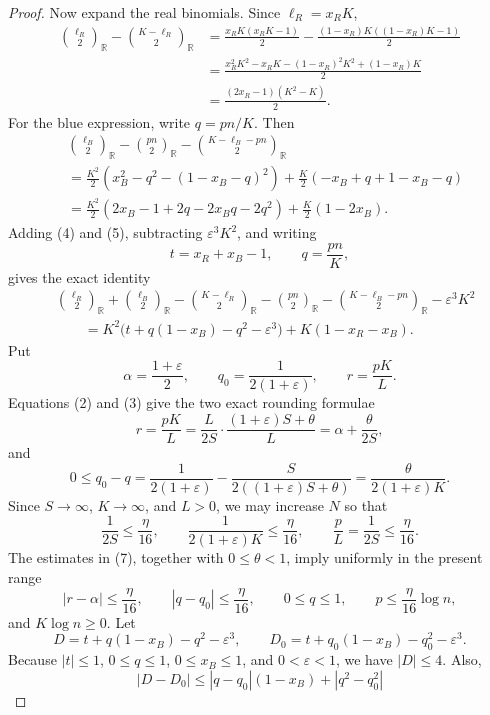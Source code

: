 \begin{proof}
Now expand the real binomials.  Since \(\ell_R=x_RK\),
\[
\begin{aligned}
\binom{\ell_R}{2}_{\mathbb R}
-\binom{K-\ell_R}{2}_{\mathbb R}
&=\frac{x_RK(x_RK-1)}2
-\frac{(1-x_R)K((1-x_R)K-1)}2\\
&=\frac{x_R^2K^2-x_RK-(1-x_R)^2K^2+(1-x_R)K}{2}\\
&=\frac{(2x_R-1)(K^2-K)}{2}. \tag{4}
\end{aligned}
\]
For the blue expression, write \(q=pn/K\).  Then
\[
\begin{aligned}
&\binom{\ell_B}{2}_{\mathbb R}
-\binom{pn}{2}_{\mathbb R}
-\binom{K-\ell_B-pn}{2}_{\mathbb R}\\
&=
\frac{K^2}{2}\left(x_B^2-q^2-(1-x_B-q)^2\right)
+\frac{K}{2}\left(-x_B+q+1-x_B-q\right)\\
&=
\frac{K^2}{2}\left(2x_B-1+2q-2x_Bq-2q^2\right)
+\frac{K}{2}(1-2x_B). \tag{5}
\end{aligned}
\]
Adding (4) and (5), subtracting \(\varepsilon^3K^2\), and writing
\[
t=x_R+x_B-1,\qquad q=\frac{pn}{K},
\]
gives the exact identity
\[
\begin{aligned}
&\binom{\ell_R}{2}_{\mathbb R}+\binom{\ell_B}{2}_{\mathbb R}
-\binom{K-\ell_R}{2}_{\mathbb R}
-\binom{pn}{2}_{\mathbb R}
-\binom{K-\ell_B-pn}{2}_{\mathbb R}
-\varepsilon^3K^2\\
&\qquad =
K^2\bigl(t+q(1-x_B)-q^2-\varepsilon^3\bigr)
+K(1-x_R-x_B). \tag{6}
\end{aligned}
\]
Put
\[
\alpha=\frac{1+\varepsilon}{2},
\qquad
q_0=\frac{1}{2(1+\varepsilon)},
\qquad
r=\frac{pK}{L}.
\]
Equations (2) and (3) give the two exact rounding formulae
\[
r=\frac{pK}{L}
=\frac{L}{2S}\cdot\frac{(1+\varepsilon)S+\theta}{L}
=\alpha+\frac{\theta}{2S},
\]
and
\[
0\le q_0-q
=\frac{1}{2(1+\varepsilon)}
-\frac{S}{2((1+\varepsilon)S+\theta)}
=\frac{\theta}{2(1+\varepsilon)K}.
\]
Since \(S\to\infty\), \(K\to\infty\), and \(L>0\), we may increase \(N\) so
that
\[
\frac{1}{2S}\le\frac{\eta}{16},\qquad
\frac{1}{2(1+\varepsilon)K}\le\frac{\eta}{16},\qquad
\frac{p}{L}=\frac{1}{2S}\le\frac{\eta}{16}. \tag{7}
\]
The estimates in (7), together with \(0\le\theta<1\), imply uniformly in the
present range
\[
|r-\alpha|\le\frac{\eta}{16},\qquad
|q-q_0|\le\frac{\eta}{16},\qquad
0\le q\le1,\qquad
p\le\frac{\eta}{16}\log n,
\tag{8}
\]
and \(K\log n\ge0\).  Let
\[
D=t+q(1-x_B)-q^2-\varepsilon^3,\qquad
D_0=t+q_0(1-x_B)-q_0^2-\varepsilon^3.
\]
Because \(|t|\le1\), \(0\le q\le1\), \(0\le x_B\le1\), and
\(0<\varepsilon<1\), we have \(|D|\le4\).  Also,
\[
|D-D_0|
\le |q-q_0|(1-x_B)+|q^2-q_0^2|
\]
\end{proof}

